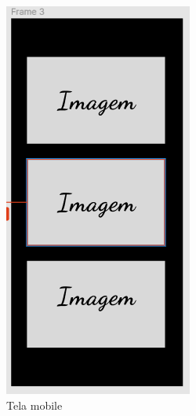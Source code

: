 \begin{figure}[H]
	\centering
	\includegraphics[width=0.5\linewidth]{prototipos/telaMobile}
	\caption[Tela mobile]{Tela mobile}
	\label{fig:fig8}
\end{figure}